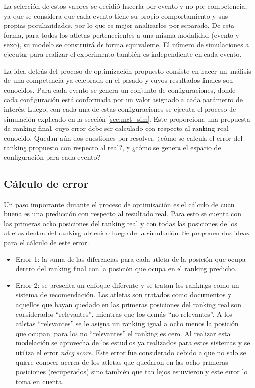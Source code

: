 La selección de estos valores se decidió hacerla por evento y no por competencia, ya que se considera que cada evento tiene su propio comportamiento y sus propias peculiaridades, por lo que es mejor analizarlos por separado. De esta forma, para todos los atletas pertenecientes a una misma modalidad (evento y sexo), su modelo se construirá de forma equivalente. El número de simulaciones a ejecutar para realizar el experimento también es independiente en cada evento. 

La idea detrás del proceso de optimización propuesto consiste en hacer un análisis de una competencia ya celebrada en el pasado y cuyos resultados finales son conocidos. Para cada evento se genera un conjunto de configuraciones, donde cada configuración está conformada por un valor asignado a cada parámetro de interés. Luego, con cada una de estas configuraciones se ejecuta el proceso de simulación explicado en la sección \ref{sec:met_sim}. Este proporciona una propuesta de ranking final, cuyo error debe ser calculado con respecto al ranking real conocido. Quedan aún dos cuestiones por resolver: ¿cómo se calcula el error del ranking propuesto con respecto al real?, y ¿cómo se genera el espacio de configuración para cada evento?

\subsection{Cálculo de error}\label{sec:errors}

Un paso importante durante el proceso de optimización es el cálculo de cuan buena es una predicción con respecto al resultado real. Para esto se cuenta con las primeras ocho posiciones del ranking real y con todas las posiciones de los atletas dentro del ranking obtenido luego de la simulación. Se proponen dos ideas para el cálculo de este error.

\begin{itemize}
    \item Error 1: la suma de las diferencias para cada atleta de la posición que ocupa dentro del ranking final con la posición que ocupa en el ranking predicho.
    \item Error 2: se presenta un enfoque diferente y se tratan los rankings como un sistema de recomendación. Los atletas son tratados como documentos y aquellos que hayan quedado en las primeras posiciones del ranking real son considerados ``relevantes'', mientras que los demás ``no relevantes''. A los atletas ``relevantes'' se le asigna un ranking igual a ocho menos la posición que ocupan, para los no ``relevantes'' el ranking es cero. Al realizar esta modelación se aprovecha de los estudios ya realizados para estos sistemas y se utiliza el error \textit{ndcg score}. Este error fue considerado debido a que no solo se quiere conocer acerca de los atletas que quedaron en las ocho primeras posiciones (recuperados) sino también que tan lejos estuvieron y este error lo toma en cuenta.
\end{itemize}

